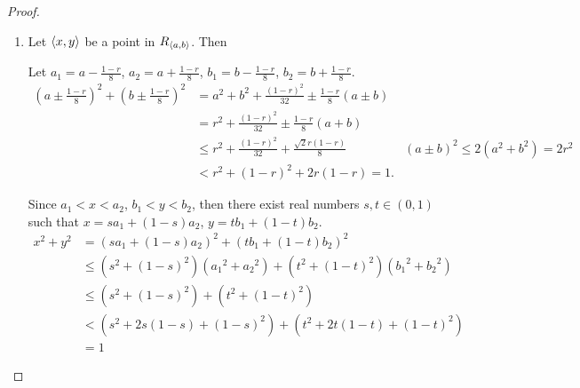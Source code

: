 \begin{proof}
    \begin{enumerate}[label={(\roman*)}]
        \item Let $\left\langle{x, y}\right\rangle$ be a point in $R_{\left\langle{a, b}\right\rangle}$. Then

              Let $a_{1} = a - \frac{1-r}{8}$, $a_{2} = a + \frac{1-r}{8}$, $b_{1} = b - \frac{1-r}{8}$, $b_{2} = b + \frac{1-r}{8}$.
              \begin{align*}
                  {\left(a \pm \frac{1-r}{8}\right)}^{2} + {\left(b \pm \frac{1-r}{8}\right)}^{2} & = a^{2} + b^{2} + \frac{{(1-r)}^{2}}{32} \pm \frac{1-r}{8}(a \pm b)                                                \\
                                                                                                  & = r^{2} + \frac{{(1-r)}^{2}}{32} \pm \frac{1-r}{8}(a + b)                                                          \\
                                                                                                  & \leq r^{2} + \frac{{(1-r)}^{2}}{32} + \frac{\sqrt{2}r(1-r)}{8}      & {(a\pm b)}^{2}\leq 2(a^{2} + b^{2}) = 2r^{2} \\
                                                                                                  & < r^{2} + {(1-r)}^{2} + 2r(1-r) = 1.
              \end{align*}

              Since $a_{1} < x < a_{2}$, $b_{1} < y < b_{2}$, then there exist real numbers $s, t\in (0, 1)$ such that $x = sa_{1} + (1-s)a_{2}$, $y = tb_{1} + (1-t)b_{2}$.
              \begin{align*}
                  x^{2} + y^{2} & = {(sa_{1} + (1-s)a_{2})}^{2} + {(tb_{1} + (1-t)b_{2})}^{2}                                              \\
                                & \leq (s^{2} + {(1-s)}^{2})({a_{1}}^{2} + {a_{2}}^{2}) + (t^{2} + {(1-t)}^{2})({b_{1}}^{2} + {b_{2}}^{2}) \\
                                & \leq (s^{2} + {(1 - s)}^{2}) + (t^{2} + {(1-t)}^{2})                                                     \\
                                & < (s^{2} + 2s(1-s) + {(1-s)}^{2}) + (t^{2} + 2t(1-t) + {(1-t)}^{2})                                      \\
                                & = 1
              \end{align*}


\end{enumerate}
\end{proof}
